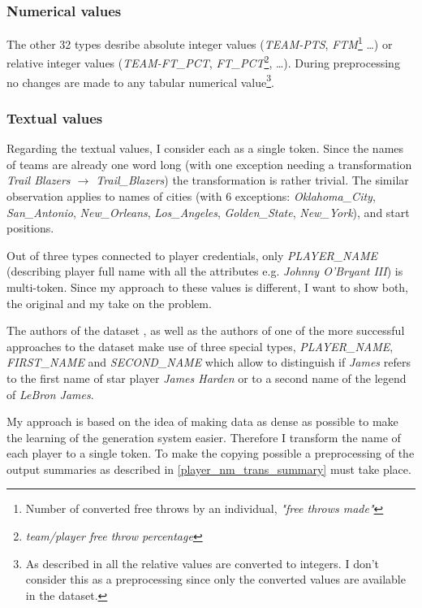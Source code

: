 \subsubsection{Numerical values}

The other 32 types desribe absolute integer values (\emph{TEAM-PTS}, \emph{FTM}\footnote{Number of converted free throws by an individual, \emph{"free throws made"}} \dots) or relative integer values (\emph{TEAM-FT\_PCT}, \emph{FT\_PCT}\footnote{\emph{team/player free throw percentage}}, \dots). During preprocessing no changes are made to any tabular numerical value\footnote{As described in \citep{wiseman2017} all the relative values are converted to integers. I don't consider this as a preprocessing since only the converted values are available in the dataset.}.

\subsubsection{Textual values} \label{trans_p_nms}

Regarding the textual values, I consider each as a single token. Since the names of teams are already one word long (with one exception needing a transformation \emph{Trail Blazers $\rightarrow$ Trail\_Blazers}) the transformation is rather trivial. The similar observation applies to names of cities (with 6 exceptions: \emph{Oklahoma\_City}, \emph{San\_Antonio}, \emph{New\_Orleans}, \emph{Los\_Angeles}, \emph{Golden\_State}, \emph{New\_York}), and start positions.

Out of three types connected to player credentials, only \emph{PLAYER\_NAME} (describing player full name with all the attributes e.g. \emph{Johnny O'Bryant III}) is multi-token. Since my approach to these values is different, I want to show both, the original and my take on the problem.

The authors of the dataset \citep{wiseman2017}, as well as the authors of one of the more successful approaches to the dataset \citep{puduppully2019datatotext} make use of three special types, \emph{PLAYER\_NAME}, \emph{FIRST\_NAME} and \emph{SECOND\_NAME} which allow to distinguish if \emph{James} refers to the first name of star player \emph{James Harden} or to a second name of the legend of \emph{LeBron James}.

My approach is based on the idea of making data as dense as possible to make the learning of the generation system easier. Therefore I transform the name of each player to a single token. To make the copying possible a preprocessing of the output summaries as described in \ref{player_nm_trans_summary} must take place. 

